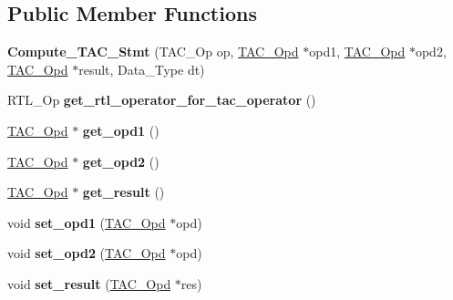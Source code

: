 \subsection*{Public Member Functions}
\begin{DoxyCompactItemize}
\item 
\mbox{\label{classCompute__TAC__Stmt_a62be94e3aeef3deab5c9ea2500fd2b70}} 
{\bfseries Compute\+\_\+\+T\+A\+C\+\_\+\+Stmt} (T\+A\+C\+\_\+\+Op op, \hyperlink{classTAC__Opd}{T\+A\+C\+\_\+\+Opd} $\ast$opd1, \hyperlink{classTAC__Opd}{T\+A\+C\+\_\+\+Opd} $\ast$opd2, \hyperlink{classTAC__Opd}{T\+A\+C\+\_\+\+Opd} $\ast$result, Data\+\_\+\+Type dt)
\item 
\mbox{\label{classCompute__TAC__Stmt_ade06a4723460836ec31d40c1067b7e68}} 
R\+T\+L\+\_\+\+Op {\bfseries get\+\_\+rtl\+\_\+operator\+\_\+for\+\_\+tac\+\_\+operator} ()
\item 
\mbox{\label{classCompute__TAC__Stmt_aefd7a18e6103b65b86a05d0721d6f33b}} 
\hyperlink{classTAC__Opd}{T\+A\+C\+\_\+\+Opd} $\ast$ {\bfseries get\+\_\+opd1} ()
\item 
\mbox{\label{classCompute__TAC__Stmt_a09efa8ce58065a9d4d559ffbb30c8f87}} 
\hyperlink{classTAC__Opd}{T\+A\+C\+\_\+\+Opd} $\ast$ {\bfseries get\+\_\+opd2} ()
\item 
\mbox{\label{classCompute__TAC__Stmt_a2fac5f3d6b58fecc84c50c83518757a8}} 
\hyperlink{classTAC__Opd}{T\+A\+C\+\_\+\+Opd} $\ast$ {\bfseries get\+\_\+result} ()
\item 
\mbox{\label{classCompute__TAC__Stmt_a292d8812461a47c8f3250aeeaae0de7e}} 
void {\bfseries set\+\_\+opd1} (\hyperlink{classTAC__Opd}{T\+A\+C\+\_\+\+Opd} $\ast$opd)
\item 
\mbox{\label{classCompute__TAC__Stmt_ab375f421aee8d75d3ff40529d39f770b}} 
void {\bfseries set\+\_\+opd2} (\hyperlink{classTAC__Opd}{T\+A\+C\+\_\+\+Opd} $\ast$opd)
\item 
\mbox{\label{classCompute__TAC__Stmt_a2570e55808af6179056afedcc570d8b4}} 
void {\bfseries set\+\_\+result} (\hyperlink{classTAC__Opd}{T\+A\+C\+\_\+\+Opd} $\ast$res)

\end{DoxyCompactItemize}

